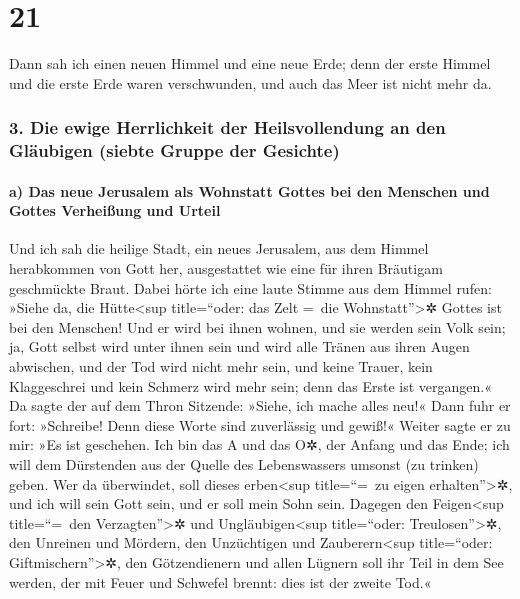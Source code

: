 \hypertarget{section-20}{%
\section{21}\label{section-20}}

 Dann sah ich einen neuen Himmel und eine neue Erde; denn
der erste Himmel und die erste Erde waren verschwunden, und auch das
Meer ist nicht mehr da.

\hypertarget{die-ewige-herrlichkeit-der-heilsvollendung-an-den-gluxe4ubigen-siebte-gruppe-der-gesichte}{%
\subsubsection{3. Die ewige Herrlichkeit der Heilsvollendung an den
Gläubigen (siebte Gruppe der
Gesichte)}\label{die-ewige-herrlichkeit-der-heilsvollendung-an-den-gluxe4ubigen-siebte-gruppe-der-gesichte}}

\hypertarget{a-das-neue-jerusalem-als-wohnstatt-gottes-bei-den-menschen-und-gottes-verheiuxdfung-und-urteil}{%
\paragraph{a) Das neue Jerusalem als Wohnstatt Gottes bei den Menschen
und Gottes Verheißung und
Urteil}\label{a-das-neue-jerusalem-als-wohnstatt-gottes-bei-den-menschen-und-gottes-verheiuxdfung-und-urteil}}

 Und ich sah die heilige Stadt, ein neues Jerusalem, aus
dem Himmel herabkommen von Gott her, ausgestattet wie eine für ihren
Bräutigam geschmückte Braut.  Dabei hörte ich eine laute
Stimme aus dem Himmel rufen: »Siehe da, die Hütte\textless sup
title=``oder: das Zelt =~die Wohnstatt''\textgreater✲ Gottes ist bei den
Menschen! Und er wird bei ihnen wohnen, und sie werden sein Volk sein;
ja, Gott selbst wird unter ihnen sein  und wird alle
Tränen aus ihren Augen abwischen, und der Tod wird nicht mehr sein, und
keine Trauer, kein Klaggeschrei und kein Schmerz wird mehr sein; denn
das Erste ist vergangen.«  Da sagte der auf dem Thron
Sitzende: »Siehe, ich mache alles neu!« Dann fuhr er fort: »Schreibe!
Denn diese Worte sind zuverlässig und gewiß!«  Weiter
sagte er zu mir: »Es ist geschehen. Ich bin das A und das O✲, der Anfang
und das Ende; ich will dem Dürstenden aus der Quelle des Lebenswassers
umsonst (zu trinken) geben.  Wer da überwindet, soll
dieses erben\textless sup title=``=~zu eigen erhalten''\textgreater✲,
und ich will sein Gott sein, und er soll mein Sohn sein. 
Dagegen den Feigen\textless sup title=``=~den Verzagten''\textgreater✲
und Ungläubigen\textless sup title=``oder: Treulosen''\textgreater✲, den
Unreinen und Mördern, den Unzüchtigen und Zauberern\textless sup
title=``oder: Giftmischern''\textgreater✲, den Götzendienern und allen
Lügnern soll ihr Teil in dem See werden, der mit Feuer und Schwefel
brennt: dies ist der zweite Tod.«

